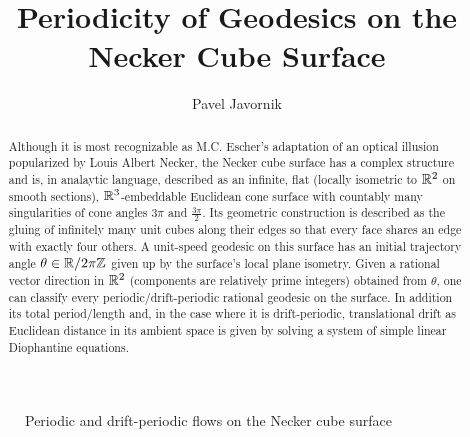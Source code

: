 \documentclass[]{article}
\begin{document}
\newtheorem{thm}{Theorem}[]
\newtheorem{Def}{Definition}[]
\newtheorem*{thm*}{Theorem}
\newtheorem*{def*}{Definition}
\newtheorem{lem}{Lemma}
\newtheorem*{rem}{Remark}
\newcommand{\shiftleft}[2]{\makebox[0pt][r]{\makebox[#1][l]{#2}}}
\newtheorem*{conj}{Conjecture}
\newtheorem{cor}{Corollary}[]

\newcommand{\compav}[1]{\textbf{\textcolor{blue}{#1}}}
\newcommand{\compat}[1]{\textbf{\textcolor{red}{#1}}}
\graphicspath{{images/}}



\title{Periodicity of Geodesics on the Necker Cube Surface}
\author{Pavel Javornik}

\maketitle

%

\begin{abstract}
\noindent Although it is most recognizable as M.C. Escher's adaptation of an optical illusion popularized by Louis Albert Necker, the Necker cube surface has a complex structure and is, in analaytic language, described as an infinite, flat (locally isometric to $\mathbb{R}^2$ on smooth sections), $\mathbb{R}^3$-embeddable Euclidean cone surface with countably many singularities of cone angles $3\pi$ and $\frac{3\pi}{2}$. Its geometric construction is described as the gluing of infinitely many unit cubes along their edges so that every face shares an edge with exactly four others. A unit-speed geodesic on this surface has an initial trajectory angle $\theta\in\mathbb{R}/2\pi\mathbb{Z}$ given up by the surface's local plane isometry. Given a rational vector direction in $\mathbb{R}^2$ (components are relatively prime integers) obtained from $\theta$, one can classify every periodic/drift-periodic rational geodesic on the surface. In addition its total period/length and, in the case where it is drift-periodic, translational drift as Euclidean distance in its ambient space is given by solving a system of simple linear Diophantine equations. 
\end{abstract}
\begin{figure}[H]
\centering

\label{fig:front}
\caption{Periodic and drift-periodic flows on the Necker cube surface}
\end{figure}
\end{document}

